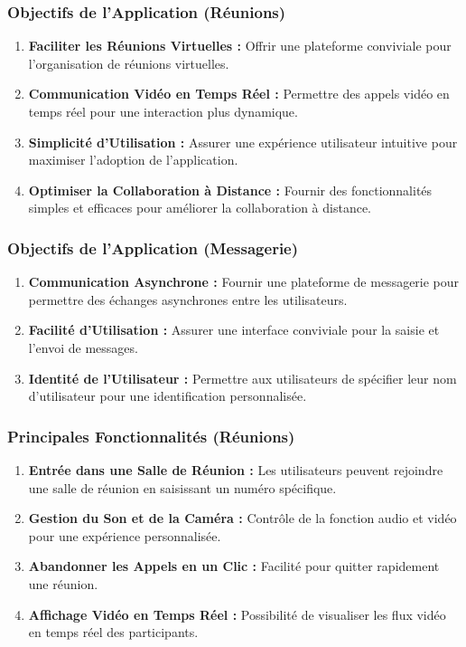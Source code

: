 \documentclass[12pt, a4paper, oneside]{article}
\begin{document}
\subsubsection{Objectifs de l'Application (Réunions)}
\begin{enumerate}
    \item \textbf{Faciliter les Réunions Virtuelles :} Offrir une plateforme conviviale pour l'organisation de réunions virtuelles.
    \item \textbf{Communication Vidéo en Temps Réel :} Permettre des appels vidéo en temps réel pour une interaction plus dynamique.
    \item \textbf{Simplicité d'Utilisation :} Assurer une expérience utilisateur intuitive pour maximiser l'adoption de l'application.
    \item \textbf{Optimiser la Collaboration à Distance :} Fournir des fonctionnalités simples et efficaces pour améliorer la collaboration à distance.
\end{enumerate}

\subsubsection{Objectifs de l'Application (Messagerie)}
\begin{enumerate}
    \item \textbf{Communication Asynchrone :} Fournir une plateforme de messagerie pour permettre des échanges asynchrones entre les utilisateurs.
    \item \textbf{Facilité d'Utilisation :} Assurer une interface conviviale pour la saisie et l'envoi de messages.
    \item \textbf{Identité de l'Utilisateur :} Permettre aux utilisateurs de spécifier leur nom d'utilisateur pour une identification personnalisée.
\end{enumerate}

\subsubsection{Principales Fonctionnalités (Réunions)}
\begin{enumerate}
    \item \textbf{Entrée dans une Salle de Réunion :} Les utilisateurs peuvent rejoindre une salle de réunion en saisissant un numéro spécifique.
    \item \textbf{Gestion du Son et de la Caméra :} Contrôle de la fonction audio et vidéo pour une expérience personnalisée.
    \item \textbf{Abandonner les Appels en un Clic :} Facilité pour quitter rapidement une réunion.
    \item \textbf{Affichage Vidéo en Temps Réel :} Possibilité de visualiser les flux vidéo en temps réel des participants.
\end{enumerate}
\end{document}
